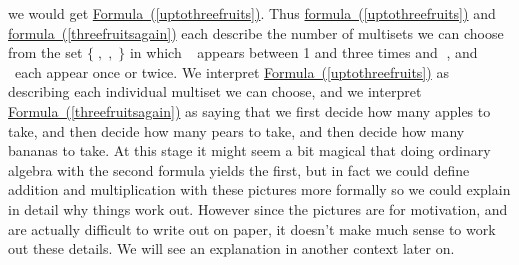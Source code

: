 \documentclass[10pt,]{book}
\theoremstyle{plain}
\theoremstyle{definition}
\numberwithin{equation}{chapter}
\newcommand{\apple}{\text{🍎}}
\newcommand{\ap}{\apple}
\newcommand{\banana}{\text{🍌}}
\newcommand{\ba}{\banana}
\newcommand{\pear}{\text{🍐}}
\newcommand{\pe}{\pear}
\begin{document}
we would get \hyperref[uptothreefruits]{Formula~(\ref{uptothreefruits})}. Thus \hyperref[uptothreefruits]{formula~(\ref{uptothreefruits})} and \hyperref[threefruitsagain]{formula~(\ref{threefruitsagain})} each describe the number of multisets we can choose from the set \(\{\ap,\pe,\ba\}\) in which \(\apple\)~appears between 1 and three times and \(\pear\), and \(\banana\)~each appear once or twice. We interpret \hyperref[uptothreefruits]{Formula~(\ref{uptothreefruits})} as describing each individual multiset we can choose, and we interpret \hyperref[threefruitsagain]{Formula~(\ref{threefruitsagain})} as saying that we first decide how many apples to take, and then decide how many pears to take, and then decide how many bananas to take. At this stage it might seem a bit magical that doing ordinary algebra with the second formula yields the first, but in fact we could define addition and multiplication with these pictures more formally so we could explain in detail why things work out. However since the pictures are for motivation, and are actually difficult to write out on paper, it doesn't make much sense to work out these details. We will see an explanation in another context later on.%
\typeout{************************************************}
\typeout{************************************************}
\end{document}
